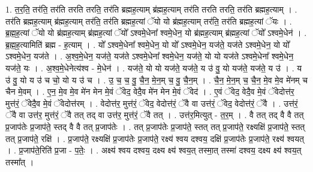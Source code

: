 \documentclass[17pt]{extarticle}
\begin{document}
1. त॒र॒ति॒ तर॑ति॒ तर॑ति तरति तरति॒ तर॑ति ब्रह्मह॒त्याम् ब्र॑ह्मह॒त्याम् तर॑ति तरति तरति॒ तर॑ति ब्रह्मह॒त्याम् । . तर॑ति ब्रह्मह॒त्याम् ब्र॑ह्मह॒त्याम् तर॑ति॒ तर॑ति ब्रह्मह॒त्यां ॅयो यो ब्र॑ह्मह॒त्याम् तर॑ति॒ तर॑ति ब्रह्मह॒त्यां ॅयः । . ब्र॒ह्म॒ह॒त्यां ॅयो यो ब्र॑ह्मह॒त्याम् ब्र॑ह्मह॒त्यां ॅयो᳚ ऽश्वमे॒धेना᳚ श्वमे॒धेन॒ यो ब्र॑ह्मह॒त्याम् ब्र॑ह्मह॒त्यां ॅयो᳚ ऽश्वमे॒धेन॑ । . ब्र॒ह्म॒ह॒त्यामिति॑ ब्रह्म - ह॒त्याम् । . यो᳚ ऽश्वमे॒धेना᳚ श्वमे॒धेन॒ यो यो᳚ ऽश्वमे॒धेन॒ यज॑ते॒ यज॑ते ऽश्वमे॒धेन॒ यो यो᳚ ऽश्वमे॒धेन॒ यज॑ते । . अ॒श्व॒मे॒धेन॒ यज॑ते॒ यज॑ते ऽश्वमे॒धेना᳚ श्वमे॒धेन॒ यज॑ते॒ यो यो यज॑ते ऽश्वमे॒धेना᳚ श्वमे॒धेन॒ यज॑ते॒ यः । . अ॒श्व॒मे॒धेनेत्य॑श्व - मे॒धेन॑ । . यज॑ते॒ यो यो यज॑ते॒ यज॑ते॒ य उ॑ वु॒ यो यज॑ते॒ यज॑ते॒ य उ॑ । . य उ॑ वु॒ यो य उ॑ च चो॒ यो य उ॑ च । . उ॒ च॒ च॒ वु॒ चै॒न॒ मे॒न॒म् च॒ वु॒ चै॒न॒म् । . चै॒न॒ मे॒न॒म् च॒ चै॒न॒ मे॒व मे॒व मे॑नम् च चैन मे॒वम् । . ए॒न॒ मे॒व मे॒व मे॑न मेन मे॒वं ॅवेद॒ वेदै॒व मे॑न मेन मे॒वं ॅवेद॑ । . ए॒वं ॅवेद॒ वेदै॒व मे॒वं ॅवेदोत्त॑र॒ मुत्त॑रं॒ ॅवेदै॒व मे॒वं ॅवेदोत्त॑रम् । . वेदोत्त॑र॒ मुत्त॑रं॒ ॅवेद॒ वेदोत्त॑रं॒ ॅवै वा उत्त॑रं॒ ॅवेद॒ वेदोत्त॑रं॒ ॅवै । . उत्त॑रं॒ ॅवै वा उत्त॑र॒ मुत्त॑रं॒ ॅवै तत् तद् वा उत्त॑र॒ मुत्त॑रं॒ ॅवै तत् । . उत्त॑र॒मित्युत् - त॒र॒म् । . वै तत् तद् वै वै तत् प्र॒जाप॑तेः प्र॒जाप॑ते॒ स्तद् वै वै तत् प्र॒जाप॑तेः । . तत् प्र॒जाप॑तेः प्र॒जाप॑ते॒ स्तत् तत् प्र॒जाप॑ते॒ रक्ष्यक्षि॑ प्र॒जाप॑ते॒ स्तत् तत् प्र॒जाप॑ते॒ रक्षि॑ । . प्र॒जाप॑ते॒ रक्ष्यक्षि॑ प्र॒जाप॑तेः प्र॒जाप॑ते॒ रक्ष्य॑ श्वय दश्वय॒ दक्षि॑ प्र॒जाप॑तेः प्र॒जाप॑ते॒ रक्ष्य॑ श्वयत् । . प्र॒जाप॑ते॒रिति॑ प्र॒जा - प॒तेः॒ । . अक्ष्य॑ श्वय दश्वय॒ दक्ष्य क्ष्य॑ श्वय॒त् तस्मा॒त् तस्मा॑ दश्वय॒ दक्ष्य क्ष्य॑ श्वय॒त् तस्मा᳚त् । \newline
\end{document}
